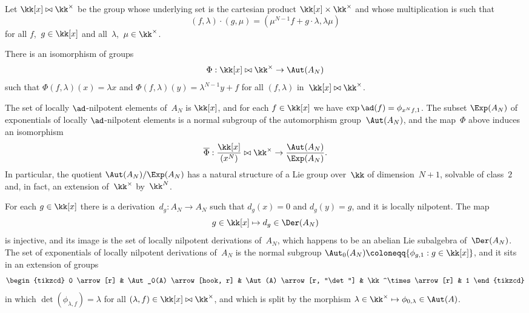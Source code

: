 \begin{Theorem}
Let $\kk[x]\bowtie\kk^\times$ be the group whose underlying set is the
cartesian product $\kk[x]\times\kk^\times$ and whose multiplication is such that
  \[
  (f,\lambda)\cdot(g,\mu) = (\mu^{N-1}f+g\cdot\lambda,\lambda\mu)
  \]
for all $f$,~$g\in\kk[x]$ and all~$\lambda$,~$\mu\in\kk^\times$. 
\begin{thmlist}

\item There is
an isomorphism of groups
  \[
  \Phi:\kk[x]\bowtie\kk^\times\to\Aut(A_N)
  \]
such that $\Phi(f,\lambda)(x) = \lambda x$ and
$\Phi(f,\lambda)(y) = \lambda^{N-1}y + f$
for all $(f,\lambda)$ in~$\kk[x]\bowtie\kk^\times$.

\item The set of locally $\ad$-nilpotent elements of~$A_N$ is $\kk[x]$, and
for each $f\in\kk[x]$ we have $\exp\ad(f)=\phi_{x^Nf,1}$. The subset
$\Exp(A_N)$ of exponentials of locally $\ad$-nilpotent elements is a normal
subgroup of the automorphism group~$\Aut(A_N)$, and the map~$\Phi$ above
induces an isomorphism
  \[
  \overline\Phi:
  \frac{\kk[x]}{(x^N)}\bowtie\kk^\times
  \to
  \frac{\Aut(A_N)}{\Exp(A_N)}.
  \]
In particular, the quotient $\Aut(A_N)/\Exp(A_N)$ has a natural structure
of a Lie group over~$\kk$ of dimension~$N+1$, solvable of class~$2$ and, in
fact, an extension of~$\kk^\times$ by~$\kk^N$.

\item For each $g\in\kk[x]$ there is a derivation~$d_g:A_N\to A_N$ such
that $d_g(x)=0$ and $d_g(y)=g$, and it is locally nilpotent. The map
  \[
  g\in\kk[x]\mapsto d_g\in\Der(A_N)
  \]
is injective, and its image is the set of locally nilpotent derivations
of~$A_N$, which happens to be an abelian Lie subalgebra of~$\Der(A_N)$. The
set of exponentials of locally nilpotent derivations of~$A_N$ 
is the normal subgroup
  \(
  \Aut_0(A_N) \coloneqq \{\phi_{g,1}:g\in\kk[x]\}
  \),
and it sits in an extension of groups
  \[
  \begin{tikzcd}
  0 \arrow[r]
    & \Aut_0(A) \arrow[hook, r]
    & \Aut(A) \arrow[r, "\det"]
    & \kk^\times \arrow[r]
    & 1
  \end{tikzcd}
  \]
in which $\det(\phi_{\lambda,f})=\lambda$ for all $(\lambda,f)\in
\kk[x]\bowtie\kk^\times$, and which is split by the morphism
$\lambda\in\kk^\times\mapsto\phi_{0,\lambda}\in\Aut(A)$.

\end{thmlist}
\end{Theorem}

